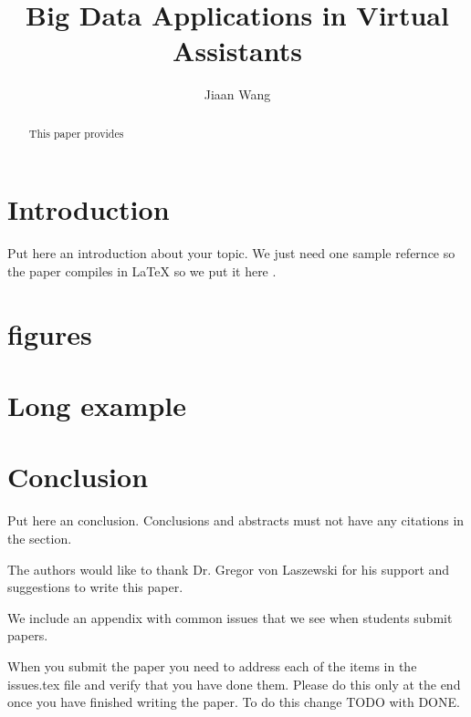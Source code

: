 \documentclass[sigconf]{acmart}
\begin{document}
\title{Big Data Applications in Virtual Assistants}

\author{Jiaan Wang}

\begin{abstract}

    This paper provides
    
\end{abstract}


\maketitle

\section{Introduction}

Put here an introduction about your topic. 
We just need one sample refernce so the paper compiles in LaTeX so we
put it here \cite{abril07}.

\section{figures}

\section{Long example}

\section{Conclusion}

Put here an conclusion. Conclusions and abstracts must not have any
citations in the section.

\begin{acks}

  The authors would like to thank Dr. Gregor von Laszewski for his
  support and suggestions to write this paper.

\end{acks}


 

\appendix

We include an appendix with common issues that we see when students
submit papers.

When you submit the paper you need to address each of the items in the
issues.tex file and verify that you have done them. Please do this
only at the end once you have finished writing the paper. To do this
change TODO with DONE. 


\end{document}
